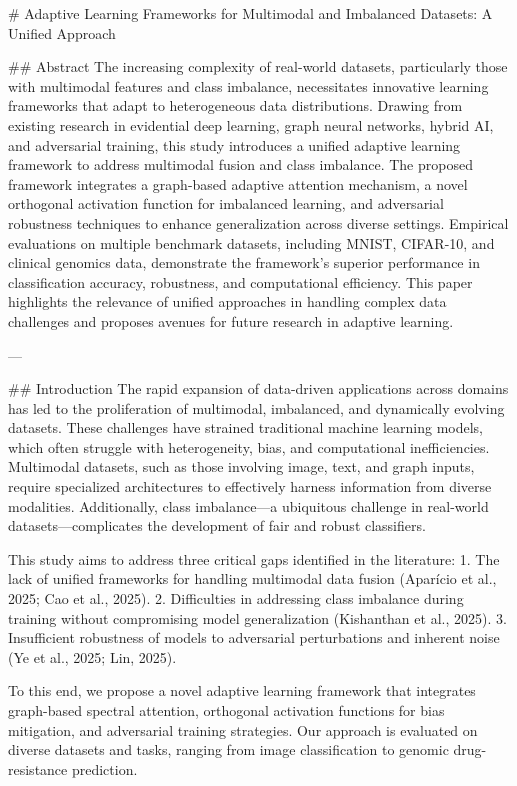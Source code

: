 # Adaptive Learning Frameworks for Multimodal and Imbalanced Datasets: A Unified Approach

## Abstract
The increasing complexity of real-world datasets, particularly those with multimodal features and class imbalance, necessitates innovative learning frameworks that adapt to heterogeneous data distributions. Drawing from existing research in evidential deep learning, graph neural networks, hybrid AI, and adversarial training, this study introduces a unified adaptive learning framework to address multimodal fusion and class imbalance. The proposed framework integrates a graph-based adaptive attention mechanism, a novel orthogonal activation function for imbalanced learning, and adversarial robustness techniques to enhance generalization across diverse settings. Empirical evaluations on multiple benchmark datasets, including MNIST, CIFAR-10, and clinical genomics data, demonstrate the framework’s superior performance in classification accuracy, robustness, and computational efficiency. This paper highlights the relevance of unified approaches in handling complex data challenges and proposes avenues for future research in adaptive learning.

---

## Introduction
The rapid expansion of data-driven applications across domains has led to the proliferation of multimodal, imbalanced, and dynamically evolving datasets. These challenges have strained traditional machine learning models, which often struggle with heterogeneity, bias, and computational inefficiencies. Multimodal datasets, such as those involving image, text, and graph inputs, require specialized architectures to effectively harness information from diverse modalities. Additionally, class imbalance—a ubiquitous challenge in real-world datasets—complicates the development of fair and robust classifiers.

This study aims to address three critical gaps identified in the literature: 
1. The lack of unified frameworks for handling multimodal data fusion (Aparício et al., 2025; Cao et al., 2025).
2. Difficulties in addressing class imbalance during training without compromising model generalization (Kishanthan et al., 2025).
3. Insufficient robustness of models to adversarial perturbations and inherent noise (Ye et al., 2025; Lin, 2025).

To this end, we propose a novel adaptive learning framework that integrates graph-based spectral attention, orthogonal activation functions for bias mitigation, and adversarial training strategies. Our approach is evaluated on diverse datasets and tasks, ranging from image classification to genomic drug-resistance prediction.

